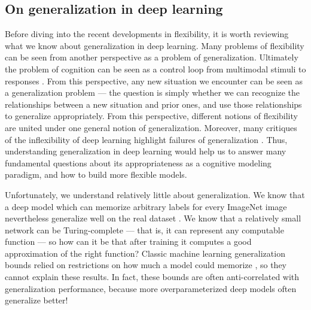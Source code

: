 \subsection{On generalization in deep learning}
Before diving into the recent developments in flexibility, it is worth reviewing what we know about generalization in deep learning. Many problems of flexibility can be seen from another perspective as a problem of generalization. Ultimately the problem of cognition can be seen as a control loop from multimodal stimuli to responses \citep{Cisek1999,Cisek2019}. From this perspective, any new situation we encounter can be seen as a generalization problem --- the question is simply whether we can recognize the relationships between a new situation and prior ones, and use those relationships to generalize appropriately. From this perspective, different notions of flexibility are united under one general notion of generalization. Moreover, many critiques of the inflexibility of deep learning highlight failures of generalization \citep[e.g.][]{Marcus2018}. Thus, understanding generalization in deep learning would help us to answer many fundamental questions about its appropriateness as a cognitive modeling paradigm, and how to build more flexible models. \par 
Unfortunately, we understand relatively little about generalization. We know that a deep model which can memorize arbitrary labels for every ImageNet image nevertheless generalize well on the real dataset \citep{Zhang2016}. We know that a relatively small network can be Turing-complete \citep{Siegelman1992} --- that is, it can represent any computable function --- so how can it be that after training it computes a good approximation of the right function? Classic machine learning generalization bounds relied on restrictions on how much a model could memorize \citep[e.g.][]{Vapnik1971}, so they cannot explain these results. In fact, these bounds are often anti-correlated with generalization performance, because more overparameterized deep models often generalize better! \par
